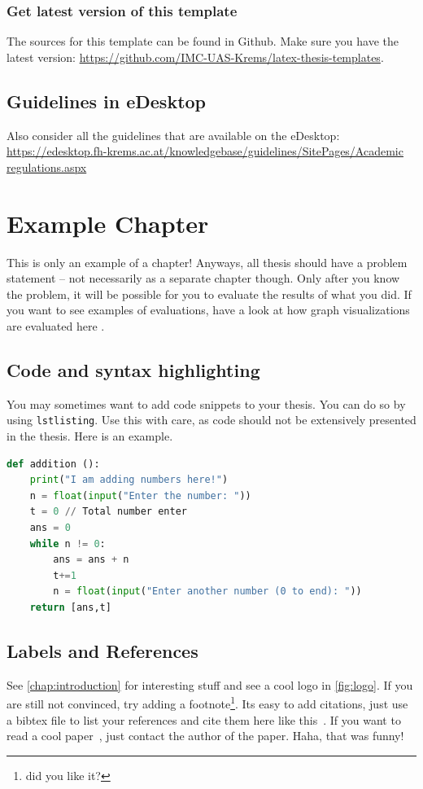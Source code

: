 \documentclass{imc-inf}
\begin{document}
\subsection{Get latest version of this template}
The sources for this template can be found in Github. Make sure you have the latest version: \url{https://github.com/IMC-UAS-Krems/latex-thesis-templates}. 

\section{Guidelines in eDesktop}
Also consider all the guidelines that are available on the eDesktop: \url{https://edesktop.fh-krems.ac.at/knowledgebase/guidelines/SitePages/Academic regulations.aspx} 


\chapter{Example Chapter}
This is only an example of a chapter! Anyways, all thesis should have a problem statement -- not necessarily as a separate chapter though. Only after you know the problem, it will be possible for you to evaluate the results of what you did. If you want to see examples of evaluations, have a look at how graph visualizations are evaluated here \cite{DBLP:journals/access/BurchHWPWH21}. 

\section{Code and syntax highlighting}

You may sometimes want to add code snippets to your thesis. You can do so by using \texttt{lstlisting}. Use this with care, as code should not be extensively presented in the thesis. Here is an example. 

\begin{lstlisting}[language=Python]
def addition ():
    print("I am adding numbers here!")
    n = float(input("Enter the number: "))
    t = 0 // Total number enter
    ans = 0
    while n != 0:
        ans = ans + n
        t+=1
        n = float(input("Enter another number (0 to end): "))
    return [ans,t]
\end{lstlisting}

\section{Labels and References}
See \autoref{chap:introduction} for interesting stuff and see a cool logo in \autoref{fig:logo}. If you are still not convinced, try adding a footnote\footnote{did you like it?}. Its easy to add citations, just use a bibtex file to list your references and cite them here like this~\cite{988366}. If you want to read a cool paper~\cite{DBLP:conf/euromicro/DhunganaHW20}, just contact the author of the paper. Haha, that was funny! 
\end{document}
